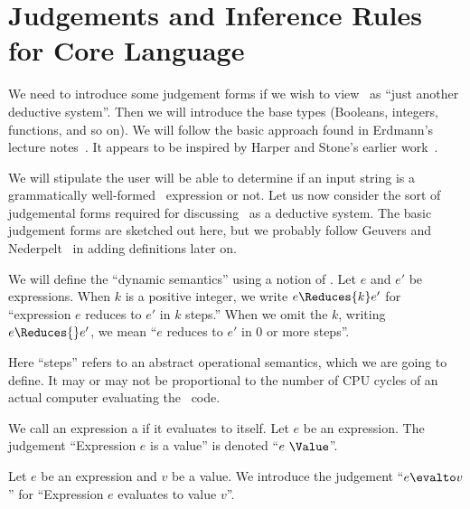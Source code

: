 \section{Judgements and Inference Rules for Core Language}
\begin{node}\label{sml-0003}%
We need to introduce some judgement forms if we wish to view \SML\ as
``just another deductive system''. Then we will introduce the base types
(Booleans, integers, functions, and so on). We will follow the basic
approach found in Erdmann's lecture notes~\cite{erdmann2023evaluation}.
It appears to be inspired by Harper and Stone's earlier work~\cite{harper2000:smltt-final}.
\end{node}

\begin{node}\label{sml-0004}%
We will stipulate the user will be able to determine if an input string
is a grammatically well-formed \SML\ expression or not. Let us now
consider the sort of judgemental forms required for discussing \SML\ as
a deductive system. The basic judgement forms are sketched out here, but
we probably follow Geuvers and Nederpelt~\cite{nederpelt2014type} in
adding definitions later on.

\begin{node}\label{sml-0005}%
We will define the ``dynamic semantics'' using a notion of
. Let $e$ and $e'$ be expressions. When $k$ is a
positive integer, we write $e\Reduces{k}e'$ for ``expression $e$ reduces
to $e'$ in $k$ steps.'' When we omit the $k$, writing $e\Reduces{}e'$,
we mean ``$e$ reduces to $e'$ in $0$ or more steps''.

Here ``steps'' refers to an abstract operational semantics, which we are
going to define. It may or may not be proportional to the number of CPU
cycles of an actual computer evaluating the \SML\ code.
\end{node}

\begin{node}\label{sml-0006}%
We call an expression a  if it evaluates to itself.
Let $e$ be an expression. The judgement ``Expression $e$ is a value'' is
denoted ``$e~\Value$''.
\end{node}

\begin{node}\label{sml-0007}%
Let $e$ be an expression and $v$ be a value. We introduce the judgement
``$e\evalto v$'' for ``Expression $e$ evaluates to value $v$''. 


\end{node}
\end{node}
